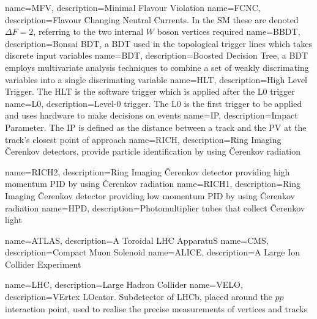 {
	name=MFV,
		description={Minimal Flavour Violation}
}
{
	name=FCNC,
		description={Flavour Changing Neutral Currents. In the \Gls{SM} these are denoted $\Delta F = 2$, referring to the two internal $W$ boson vertices required}}
{
	name=BBDT,
		description={Bonsai BDT, a BDT used in the topological trigger lines which takes discrete input variables}}
{
	name=BDT,
		description={Boosted Decision Tree, a BDT employs multivariate analysis techniques to combine a set of weakly discrimating variables into a single discrimating variable}}                   
{
	name=HLT,
		description={High Level Trigger. The HLT is the software trigger which is applied after the \Gls{L0} trigger}}
{
	name=L0,
		description={Level-0 trigger. The L0 is the first trigger to be applied and uses hardware to make decisions on events  }}                   
{
	name=IP,
		description={Impact Parameter. The IP is defined as the distance between a track and the \Gls{PV} at the track's closest point of approach }}                                                                        
{
	name=RICH,
		description={Ring Imaging \v{C}erenkov detectors, provide particle identification by using \v{C}erenkov radiation}                         
}

{
	name=RICH2,
		description={Ring Imaging \v{C}erenkov detector providing high momentum \gls{PID} by using \v{C}erenkov radiation}                         
}
{
	name=RICH1,
		description={Ring Imaging \v{C}erenkov detector providing low momentum \gls{PID} by using \v{C}erenkov radiation}                         
}
{
	name=HPD,
		description={Photomultiplier tubes that collect \v{C}erenkov light}
}

{
	name=ATLAS,
		description={A Toroidal LHC ApparatuS}
}
{
	name=CMS,
		description={Compact Muon Solenoid}
}
{
	name=ALICE,
		description={A Large Ion Collider Experiment}
}

{
	name=LHC,
		description={Large Hadron Collider}
}
{
	name=VELO,
		description={VErtex LOcator. Subdetector of LHCb, placed around the $pp$ interaction point, used to realise the precise measurements of vertices and tracks}
}

